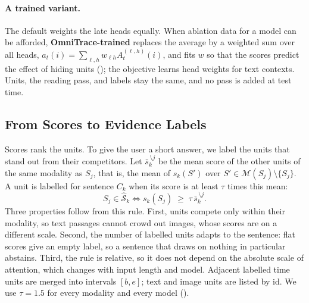 \paragraph{A trained variant.}
The default weights the late heads equally. When ablation data for a model can be afforded, \textbf{OmniTrace-trained} replaces the average by a weighted sum over all heads, $a_t(i)=\sum_{\ell,h}w_{\ell h}A^{(\ell,h)}_t(i)$, and fits $w$ so that the scores predict the effect of hiding units (); the objective learns head weights for text contexts.
Units, the reading pass, and labels stay the same, and no pass is added at test time.

\subsection{From Scores to Evidence Labels}
\label{sec:labels}

Scores rank the units. To give the user a short answer, we label the units that stand out from their competitors.
Let $\bar{s}_k^{\,\setminus j}$ be the mean score of the other units of the same modality as $S_j$, that is, the mean of $s_k(S')$ over $S'\in\mathcal{M}(S_j)\setminus\{S_j\}$.
A unit is labelled for sentence $C_k$ when its score is at least $\tau$ times this mean:
\begin{equation}
S_j\in\hat{\mathcal{S}}_k \iff s_k(S_j)\;\ge\;\tau\,\bar{s}_k^{\,\setminus j}.
\label{eq:label}
\end{equation}
Three properties follow from this rule.
First, units compete only within their modality, so text passages cannot crowd out images, whose scores are on a different scale.
Second, the number of labelled units adapts to the sentence: flat scores give an empty label, so a sentence that draws on nothing in particular abstains.
Third, the rule is relative, so it does not depend on the absolute scale of attention, which changes with input length and model.
Adjacent labelled time units are merged into intervals $[b,e]$; text and image units are listed by id.
We use $\tau=1.5$ for every modality and every model ().
